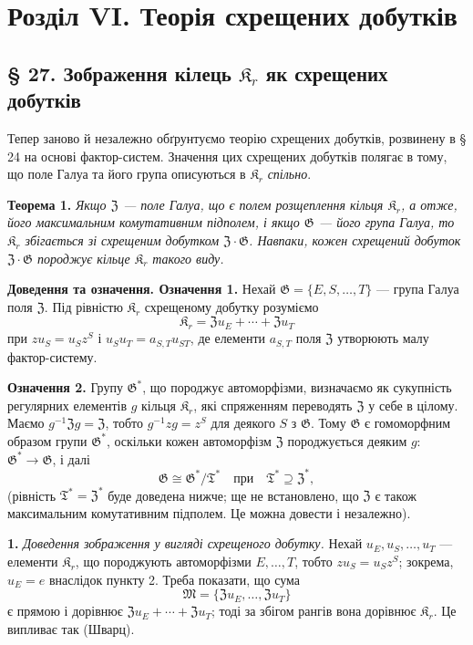\documentclass[11pt]{article}
\begin{document}
\section*{Розділ VI. Теорія схрещених добутків}\label{kapitel-vi.-theorie-der-verschraenkten-produkte}

\subsection*{§ 27. Зображення кілець \(\mathfrak K_r\) як схрещених добутків}

Тепер заново й незалежно обґрунтуємо теорію схрещених добутків, розвинену в § 24 на основі фактор-систем. Значення цих схрещених добутків полягає в тому, що поле Галуа та його група описуються в \(\mathfrak K_r\) \emph{спільно}.

\noindent\textbf{Теорема 1.} \emph{Якщо \(\mathfrak Z\) --- поле Галуа, що є полем розщеплення кільця \(\mathfrak K_r\), а отже, його максимальним комутативним підполем, і якщо \(\mathfrak G\) --- його група Галуа, то \(\mathfrak K_r\) збігається зі схрещеним добутком \(\mathfrak Z\cdot\mathfrak G\). Навпаки, кожен схрещений добуток \(\mathfrak Z\cdot\mathfrak G\) породжує кільце \(\mathfrak K_r\) такого виду.}

\noindent\textbf{Доведення та означення. Означення 1.} Нехай \(\mathfrak G=\{E,S,\ldots,T\}\) --- група Галуа поля \(\mathfrak Z\). Під рівністю \(\mathfrak K_r\) схрещеному добутку розуміємо
\[
\mathfrak K_r=\mathfrak Zu_E+\cdots+\mathfrak Zu_T
\]
при \(zu_S=u_Sz^S\) і \(u_Su_T=a_{S,T}u_{ST}\), де елементи \(a_{S,T}\) поля \(\mathfrak Z\) утворюють малу фактор-систему.

\noindent\textbf{Означення 2.} Групу \(\mathfrak G^*\), що породжує автоморфізми, визначаємо як сукупність регулярних елементів \(g\) кільця \(\mathfrak K_r\), які спряженням переводять \(\mathfrak Z\) у себе в цілому. Маємо \(g^{-1}\mathfrak Zg=\mathfrak Z\), тобто \(g^{-1}zg=z^S\) для деякого \(S\) з \(\mathfrak G\). Тому \(\mathfrak G\) є гомоморфним образом групи \(\mathfrak G^*\), оскільки кожен автоморфізм \(\mathfrak Z\) породжується деяким \(g\): \(\mathfrak G^*\to\mathfrak G\), і далі
\[
\mathfrak G\cong\mathfrak G^*/\mathfrak T^*
\quad\text{при}\quad
\mathfrak T^*\supseteq\mathfrak Z^*,
\]
(рівність \(\mathfrak T^*=\mathfrak Z^*\) буде доведена нижче; ще не встановлено, що \(\mathfrak Z\) є також максимальним комутативним підполем. Це можна довести і незалежно).

\noindent\textbf{1.} \emph{Доведення зображення у вигляді схрещеного добутку.} Нехай \(u_E,u_S,\ldots,u_T\) --- елементи \(\mathfrak K_r\), що породжують автоморфізми \(E,\ldots,T\), тобто \(zu_S=u_Sz^S\); зокрема, \(u_E=e\) внаслідок пункту 2. Треба показати, що сума
\[
\mathfrak M=\{\mathfrak Zu_E,\ldots,\mathfrak Zu_T\}
\]
є прямою і дорівнює \(\mathfrak Zu_E+\cdots+\mathfrak Zu_T\); тоді за збігом рангів вона дорівнює \(\mathfrak K_r\). Це випливає так (Шварц).
\end{document}
